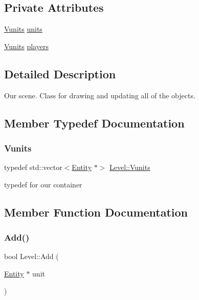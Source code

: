 \subsection*{Private Attributes}
\begin{DoxyCompactItemize}
\item 
\mbox{\hyperlink{class_level_a015a1fa25ecf592918309b2d06e5784b}{Vunits}} \mbox{\hyperlink{class_level_abdf229333597aada073f91fc9b4b6932}{units}}
\item 
\mbox{\hyperlink{class_level_a015a1fa25ecf592918309b2d06e5784b}{Vunits}} \mbox{\hyperlink{class_level_aaab0af4a98e967392e735e5f38231571}{players}}
\end{DoxyCompactItemize}


\subsection{Detailed Description}
Our scene. Class for drawing and updating all of the objects. 

\subsection{Member Typedef Documentation}
\mbox{\label{class_level_a015a1fa25ecf592918309b2d06e5784b}} 
\subsubsection{\texorpdfstring{Vunits}{Vunits}}
{\footnotesize\ttfamily typedef std\+::vector$<$\mbox{\hyperlink{class_entity}{Entity}} $\ast$$>$ \mbox{\hyperlink{class_level_a015a1fa25ecf592918309b2d06e5784b}{Level\+::\+Vunits}}}

typedef for our container 

\subsection{Member Function Documentation}
\mbox{\label{class_level_a3c6eeec185ecf58fbc2022b281896b50}} 
\subsubsection{\texorpdfstring{Add()}{Add()}}
{\footnotesize\ttfamily bool Level\+::\+Add (\begin{DoxyParamCaption}\item[{\mbox{\hyperlink{class_entity}{Entity}} $\ast$}]{unit }\end{DoxyParamCaption})}

